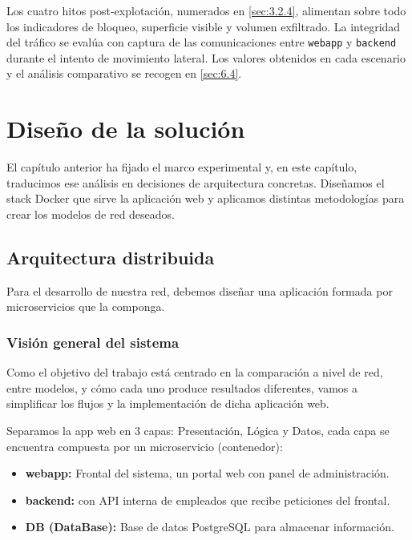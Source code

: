\documentclass[11pt,spanish,listoffigures,listoftables]{tfgetsinf}
\begin{document}
    Los cuatro hitos post-explotación, numerados en \cref{sec:3.2.4}, alimentan sobre todo los indicadores de bloqueo, superficie visible y volumen exfiltrado. La integridad del tráfico se evalúa con captura de las comunicaciones entre \texttt{webapp} y \texttt{backend} durante el intento de movimiento lateral. Los valores obtenidos en cada escenario y el análisis comparativo se recogen en \cref{sec:6.4}.
    

\chapter{Diseño de la solución}
\label{sec:4}
El capítulo anterior ha fijado el marco experimental y, en este capítulo, traducimos ese análisis en decisiones de arquitectura concretas. Diseñamos el stack Docker que sirve la aplicación web y aplicamos distintas metodologías para crear los modelos de red deseados.

    \section{Arquitectura distribuida}
    Para el desarrollo de nuestra red, debemos diseñar una aplicación formada por microservicios que la componga.

        \subsection{Visión general del sistema}
        Como el objetivo del trabajo está centrado en la comparación a nivel de red, entre modelos, y cómo cada uno produce resultados diferentes, vamos a simplificar los flujos y la implementación de dicha aplicación web.

        Separamos la app web en 3 capas: Presentación, Lógica y Datos, cada capa se encuentra compuesta por un microservicio (contenedor):
        \begin{itemize}
            \item \textbf{webapp:} Frontal del sistema, un portal web con panel de administración.
            \item \textbf{backend:} con API interna de empleados que recibe peticiones del frontal.
            \item \textbf{DB (DataBase):} Base de datos PostgreSQL para almacenar información.
        \end{itemize}
\end{document}

